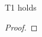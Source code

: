 \documentclass{amsart}
\begin{document}
\begin{theorem}
T1 holds
\end{theorem}

\begin{proof}
\end{proof}
\end{document}
